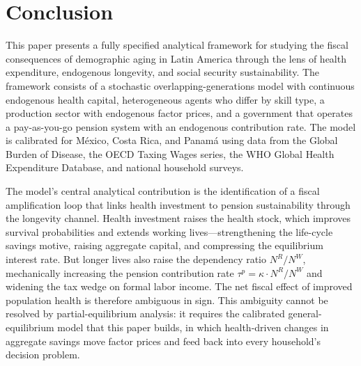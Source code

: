 \documentclass[12pt,a4paper]{article}
\begin{document}
\section{Conclusion}
\label{sec:conclusion}

This paper presents a fully specified analytical framework for studying the fiscal consequences of demographic aging in Latin America through the lens of health expenditure, endogenous longevity, and social security sustainability. The framework consists of a stochastic overlapping-generations model with continuous endogenous health capital, heterogeneous agents who differ by skill type, a production sector with endogenous factor prices, and a government that operates a pay-as-you-go pension system with an endogenous contribution rate. The model is calibrated for M\'exico, Costa Rica, and Panam\'a using data from the Global Burden of Disease, the OECD Taxing Wages series, the WHO Global Health Expenditure Database, and national household surveys.

The model's central analytical contribution is the identification of a fiscal amplification loop that links health investment to pension sustainability through the longevity channel. Health investment raises the health stock, which improves survival probabilities and extends working lives---strengthening the life-cycle savings motive, raising aggregate capital, and compressing the equilibrium interest rate. But longer lives also raise the dependency ratio $N^R/N^W$, mechanically increasing the pension contribution rate $\tau^p = \kappa \cdot N^R/N^W$ and widening the tax wedge on formal labor income. The net fiscal effect of improved population health is therefore ambiguous in sign. This ambiguity cannot be resolved by partial-equilibrium analysis: it requires the calibrated general-equilibrium model that this paper builds, in which health-driven changes in aggregate savings move factor prices and feed back into every household's decision problem.
\end{document}
